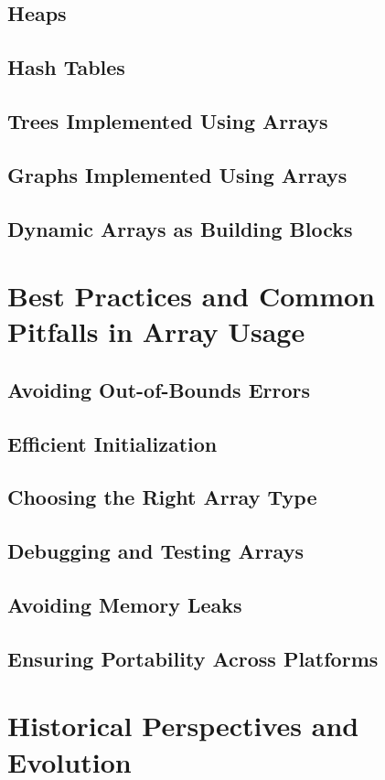 \documentclass[12pt, oneside]{book}
\begin{document}
\section{Heaps}
\section{Hash Tables}
\section{Trees Implemented Using Arrays}
\section{Graphs Implemented Using Arrays}
\section{Dynamic Arrays as Building Blocks}

\chapter{Best Practices and Common Pitfalls in Array Usage}
\section{Avoiding Out-of-Bounds Errors}
\section{Efficient Initialization}
\section{Choosing the Right Array Type}
\section{Debugging and Testing Arrays}
\section{Avoiding Memory Leaks}
\section{Ensuring Portability Across Platforms}

\chapter{Historical Perspectives and Evolution}
\end{document}
